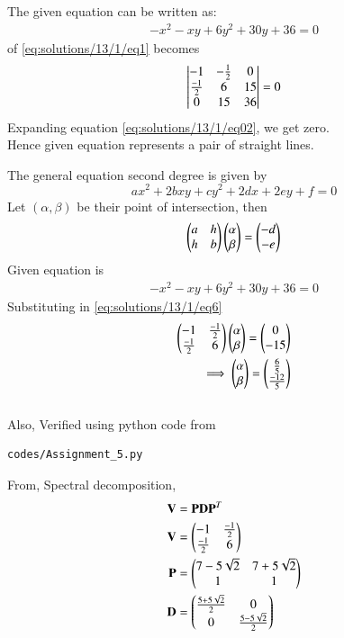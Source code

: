 
The given equation can be written as:
\begin{align}
-x^2-xy+6y^2+30y+36=0 \label{eq:solutions/13/1/eq1}
\end{align}
 of \eqref{eq:solutions/13/1/eq1} becomes
\begin{align}
    \begin{vmatrix}-1&-\frac{1}{2}&0\\\frac{-1}{2}&6&15\\0&15&36\end{vmatrix}=0\label{eq:solutions/13/1/eq02}
\end{align}
Expanding equation \eqref{eq:solutions/13/1/eq02}, we get zero.\\
Hence given equation represents a pair of straight lines.

The general equation second degree is given by
\begin{equation}\label{eq:solutions/13/1/eq5}
	ax^2 + 2bxy + cy^2 + 2dx + 2ey + f = 0
\end{equation}
Let $(\alpha,\beta)$ be their point of intersection, then
\begin{equation}\label{eq:solutions/13/1/eq6}
	\begin{pmatrix} a & h\\ h & b\end{pmatrix}\begin{pmatrix}\alpha \\ \beta\end{pmatrix} = \begin{pmatrix}-d \\ -e\end{pmatrix}
\end{equation}
Given equation is
\begin{align}
	-x^2-xy+6y^2+30y+36=0
\end{align}
Substituting in \eqref{eq:solutions/13/1/eq6}
\begin{align}
	\label{eq:solutions/13/1/eq16}\begin{pmatrix} -1 & \frac{-1}{2}\\\frac{-1}{2} & 6\end{pmatrix}\begin{pmatrix}\alpha \\ \beta\end{pmatrix} = \begin{pmatrix}0 \\ -15\end{pmatrix} \\
	\label{eq:solutions/13/1/eq17}\implies \begin{pmatrix}\alpha \\ \beta\end{pmatrix} =\begin{pmatrix}\frac{6}{5} \\ \frac{-12}{5}\end{pmatrix}
\end{align}
\\
Also, Verified using python code from
\begin{lstlisting}
codes/Assignment_5.py
\end{lstlisting}
From, Spectral decomposition,
\begin{align}
	\mathbf{V} &= \mathbf{P}\mathbf{D}\mathbf{P}^T\\
	\label{eq:solutions/13/1/eq18}\mathbf{V} &= \begin{pmatrix} -1 & \frac{-1}{2}\\\frac{-1}{2} & 6\end{pmatrix}\\
	\label{eq:solutions/13/1/eq19}\mathbf{P} &= \begin{pmatrix}7-5 \sqrt{2} & 7+5 \sqrt{2}\\ 1 & 1\end{pmatrix}\\
	\label{eq:solutions/13/1/eq20}\mathbf{D} &= \begin{pmatrix}\frac{5+5\sqrt{2}}{2} & 0\\ 0 & \frac{5-5\sqrt{2}}{2}\end{pmatrix}
\end{align}
